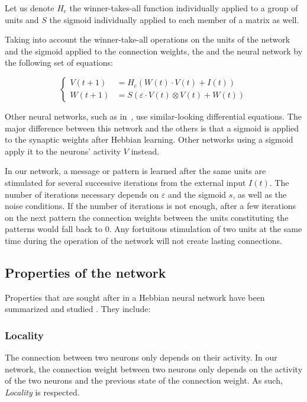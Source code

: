 \documentclass[journal]{IEEEtran}
\begin{document}
Let us denote $H_c$ the winner-takes-all function individually applied to a group of units and $S$ the sigmoid individually applied to each member of a matrix as well.
 
Taking into account the winner-take-all operations on the units of the network and the sigmoid applied to the connection weights, the and the neural network by the following set of equations:

\begin{equation}
\left\{\begin{array}{ll} V(t+1) &= H_c\left(W(t) \cdot V(t) + I(t)\right) \\
 W(t+1) &= S\left(\varepsilon \cdot V(t) \otimes V(t) + W(t)\right)\end{array}\right.
\end{equation}

Other neural networks, such as in~\cite{galtier2012hebbian}, use similar-looking differential equations. The major difference between this network and the others is that a sigmoid is applied to the synaptic weights after Hebbian learning. Other networks using a sigmoid apply it to the neurons' activity $V$ instead.

In our network, a message or pattern is learned after the same units are stimulated for several successive iterations from the external input $I(t)$. The number of iterations necessary depends on $\varepsilon$ and the sigmoid $s$, as well as the noise conditions. If the number of iterations is not enough, after a few iterations on the next pattern the connection weights between the units constituting the patterns would fall back to $0$. Any fortuitous stimulation of two units at the same time during the operation of the network will not create lasting connections.

\subsection{Properties of the network}

Properties that are sought after in a Hebbian neural network have been
summarized and studied \cite{gerstner2002mathematical}. They include:

\subsubsection{Locality} The connection between two neurons only
depends on their activity. In our network, the connection weight between two neurons only depends on the activity of the two neurons and the previous state of the connection weight. As such, \emph{Locality} is respected.
\end{document}

